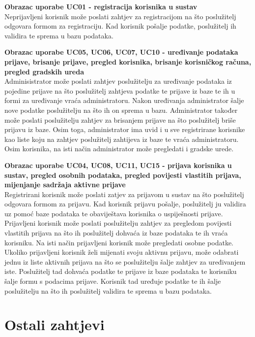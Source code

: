 				
				\textbf{Obrazac uporabe UC01 - registracija korisnika u sustav}\\
				Neprijavljeni korisnik može poslati zahtjev za registracijom na što poslužitelj odgovara formom za registraciju. Kad korisnik pošalje podatke, poslužitelj ih validira te sprema u bazu podataka.

				\textbf{Obrazac uporabe UC05, UC06, UC07, UC10 - uređivanje podataka prijave, brisanje prijave, pregled korisnika, brisanje korisničkog računa, pregled gradskih ureda}\\
				Adminisistrator može poslati zahtjev poslužitelju za uređivanje podataka iz pojedine prijave na što poslužitelj zahtjeva podatke te prijave iz baze te ih u formi za uređivanje vraća administratoru. Nakon uređivanja administrator šalje nove podatke poslužitelju na što ih on sprema u bazu.
				Administrator također može poslati poslužitelju zahtjev za brisanjem prijave na što poslužitelj briše prijavu iz baze.
				Osim toga, administrator ima uvid i u sve registrirane korisnike kao liste koju na zahtjev poslužitelj zahtijeva iz baze te vraća administratoru.
				Osim korisnika, na isti način administrator može pregledati i gradske urede.

				\textbf{Obrazac uporabe UC04, UC08, UC11, UC15 - prijava korisnika u sustav, pregled osobnih podataka, pregled povijesti vlastitih prijava, mijenjanje sadržaja aktivne prijave}\\
				Registrirani korisnik može poslati zatjev za prijavom u sustav na što poslužitelj odgovara formom za prijavu. Kad korisnik prijavu pošalje, poslužitelj ju validira uz pomoć baze podataka te obaviještava korisnika o uspiješnosti prijave. Prijavljeni korisnik može poslati poslužitelju zahtjev za pregledom povijesti vlastitih prijava na što ih poslužitelj dohvaća iz baze podataka te ih vraća korisniku. Na isti način prijavljeni korisnik može pregledati osobne podatke.
				Ukoliko prijavljeni korisnik želi mijenati svoju aktivnu prijavu, može odabrati jednu iz liste aktivnih prijava na što se poslužitelju šalje zahtjev za uređivanjem iste. Poslužitelj tad dohvaća podatke te prijave iz baze podataka te korisniku šalje formu s podacima prijave. Korisnik tad uređuje podatke te ih šalje poslužitelju na što ih poslužitelj validira te sprema u bazu podataka.

				\eject
	
		\section{Ostali zahtjevi}
		
